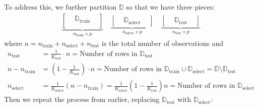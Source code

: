 \documentclass[12pt, a4paper]{article}
\theoremstyle{definition}
\newcommand{\test}{\text{test}}
\newcommand{\train}{\text{train}}
\newcommand{\select}{\text{select}}
\newcommand{\Dtest}{\mathbb{D}_{\test}}
\newcommand{\Dtrain}{\mathbb{D}_{\train}}
\newcommand{\Dselect}{\mathbb{D}_{\select}}
\begin{document}
	To address this, we further partition $\mathbb{D}$ so that we have three
	pieces:
	\begin{align*}
		\underbrace{
			\begin{bmatrix}
				{} & \mathbb{D}_{\text{train}} & {}\\
			\end{bmatrix}
		}_{n_{\text{train}}\times p}\quad
		\underbrace{
			\begin{bmatrix}
				{} & \mathbb{D}_{\text{select}} & {}
			\end{bmatrix}
		}_{n_{\text{select}}\times p}\quad
		\underbrace{
			\begin{bmatrix}
				{} & \mathbb{D}_{\text{test}} & {}
			\end{bmatrix}
		}_{n_{\text{test}}\times p}
	\end{align*}
	where $n=n_\train + n_\select + n_\test$ is the total number of observations and
	\begin{align*}
		n_\test &= \frac{1}{K_\test}\cdot n = \text{Number of rows in }\Dtest\\
		n-n_\train&=\left(1- \frac{1}{K_\test}\right)\cdot n = \text{Number of rows in }\Dtrain\cup \Dselect = \mathbb{D} \setminus \Dtest\\
		n_\select &= \frac{1}{K_\select}(n-n_\train) = \frac{1}{K_\select}\left(1 - \frac{1}{K_\test}\right)n=\text{Number of rows in }\Dselect
	\end{align*}
	Then we repeat the process from earlier, replacing $\Dtest$ with $\Dselect$:
\end{document}

